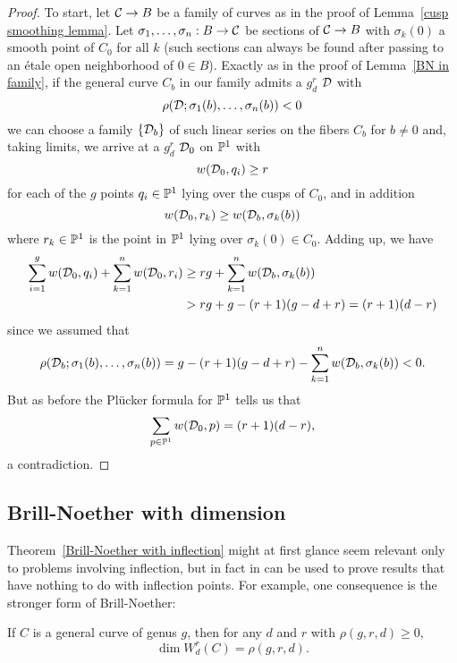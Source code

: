 \begin{proof}
To start, let $\cC \to B$ be a family of curves as in the proof of Lemma~\ref{cusp smoothing lemma}. Let $\sigma_1, \dots, \sigma_n : B \to \cC$ be sections of $\cC \to B$ with $\sigma_k(0)$ a smooth point of $C_0$ for all $k$ (such sections can always be found after passing to an \'etale open neighborhood of $0 \in B$). Exactly as in the proof of Lemma~\ref{BN in family}, if the general curve $C_b$ in our family admits a $g^r_d$ $\cD$ with
$$
\rho(\cD;\sigma_1(b),\dots,\sigma_n(b)) < 0
$$
we can choose a family $\{\cD_b\}$ of such linear series on the fibers $C_b$ for $b \neq 0$ and, taking limits, we arrive at a $g^r_d$ $\cD_0$ on $\PP^1$ with
$$
w(\cD_0, q_i) \geq r
$$
for each of the $g$ points $q_i \in \PP^1$ lying over the cusps of $C_0$, and in addition
$$
w(\cD_0, r_k) \geq w(\cD_b,\sigma_k(b))
$$
where $r_k \in \PP^1$ is the point in $\PP^1$ lying over $\sigma_k(0) \in C_0$. Adding up, we have
\begin{align*}
\sum_{i=1}^g w(\cD_0, q_i) + \sum_{k=1}^n w(\cD_0, r_i) &\geq rg + \sum_{k=1}^n w(\cD_b,\sigma_k(b)) \\
&> rg + g - (r+1)(g-d+r) = (r+1)(d-r)
\end{align*}
since we assumed that 
$$
\rho(\cD_b;\sigma_1(b),\dots,\sigma_n(b)) = g - (r+1)(g-d+r) - \sum_{k=1}^n w(\cD_b,\sigma_k(b)) < 0.
$$
But as before the Pl\"ucker formula for $\PP^1$ tells us that
$$
\sum_{p \in \PP^1} w(\cD_0, p) = (r+1)(d-r),
$$
a contradiction.
\end{proof}

\subsection{Brill-Noether with dimension}

Theorem~\ref{Brill-Noether with inflection} might at first glance seem relevant only to problems involving inflection, but in fact in can be used to prove results that have nothing to do with inflection points. For example, one consequence is the stronger form of Brill-Noether:

\begin{theorem}\label{BN with dimension}
If $C$ is a general curve of genus $g$, then for any $d$ and $r$ with $\rho(g,r,d) \geq 0$,
$$
\dim W^r_d(C) = \rho(g,r,d).
$$
\end{theorem}

